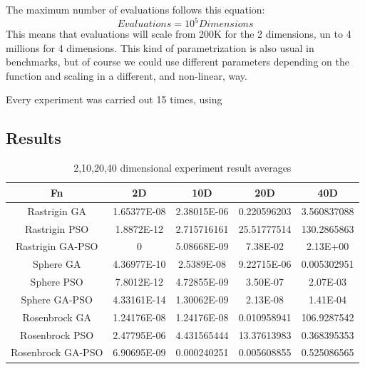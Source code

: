 \documentclass[runningheads]{llncs}
\begin{document}
The maximum number of evaluations follows this equation:
\begin{equation}
    \label{eq:hesitancy-interpretation}
   Evaluations = 10^{5} Dimensions
   \end{equation}
This means that evaluations will scale from 200K for the 2 dimensions,
un to 4 millions for 4 dimensions.  This kind of parametrization is
also usual in benchmarks, but of course we could use different
parameters depending on the function and scaling in a different, and
non-linear, way. 

Every experiment was carried out 15 times, using %

\subsection{Results}
\label{subs:results}
%
\begin{table}[htp]
  \caption{2,10,20,40 dimensional experiment result averages}
  \label{table:resultados-2}
  \centering
  \begin{tabular}{|c|c|c|c|c|}
  \hline
  Fn & 2D & 10D & 20D & 40D \\
  \hline
  \hline
  Rastrigin GA & 1.65377E-08 & 2.38015E-06 & 0.220596203 & 3.560837088  \\
  \hline
  Rastrigin PSO & 1.8872E-12 & 2.715716161 & 25.51777514 & 130.2865863  \\
  \hline
  Rastrigin GA-PSO & 0 & 5.08668E-09 & 7.38E-02 & 2.13E+00\\
  \hline
  Sphere GA  & 4.36977E-10 & 2.5389E-08 & 9.22715E-06  & 0.005302951 \\
  \hline
  Sphere PSO & 7.8012E-12 & 4.72855E-09 & 3.50E-07 & 2.07E-03\\
  \hline
  Sphere GA-PSO & 4.33161E-14 & 1.30062E-09 & 2.13E-08  & 1.41E-04\\
  \hline
  Rosenbrock GA & 1.24176E-08 & 1.24176E-08 & 0.010958941  & 106.9287542   \\
  \hline
  Rosenbrock PSO & 2.47795E-06 & 4.431565444 & 13.37613983  & 0.368395353   \\
  \hline
  Rosenbrock GA-PSO & 6.90695E-09 & 0.000240251 & 0.005608855 & 0.525086565  \\
  \hline
  \end{tabular}
  \end{table}
  
\end{document}
